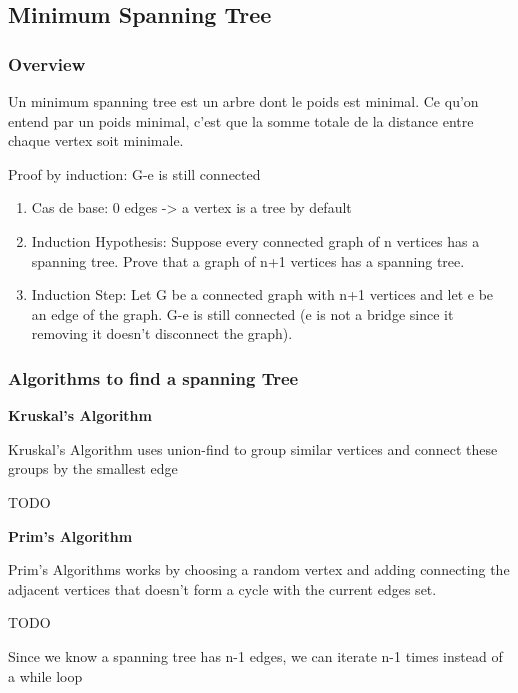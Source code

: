 \documentclass{article}
\begin{document}
\subsection{Minimum Spanning Tree}%
\label{sub:Minimum Spanning Tree}

\subsubsection{Overview}%
\label{ssub:Overview}

Un minimum spanning tree est un arbre dont le poids est minimal. Ce qu'on
entend par un poids minimal, c'est que la somme totale de la distance entre
chaque vertex soit minimale.

\begin{theorem}
    Proof by induction: G-e is still connected
    \begin{enumerate}
        \item Cas de base: 0 edges -> a vertex is a tree by default
	\item Induction Hypothesis: Suppose every connected graph of n vertices
	    has a spanning tree. Prove that a graph of n+1 vertices has a
	    spanning tree.
	\item Induction Step: Let G be a connected graph with n+1 vertices and
	    let e be an edge of the graph. G-e is still connected (e is not
	    a bridge since it removing it doesn't disconnect the graph).
    \end{enumerate}
\end{theorem}

\subsubsection{Algorithms to find a spanning Tree}%
\label{ssub:}

\textbf{Kruskal's Algorithm}

Kruskal's Algorithm uses union-find to group similar vertices and connect these
groups by the smallest edge

TODO

\textbf{Prim's Algorithm}

Prim's Algorithms works by choosing a random vertex and adding connecting the
adjacent vertices that doesn't form a cycle with the current edges set.

TODO

\begin{remark}
    Since we know a spanning tree has n-1 edges, we can iterate n-1 times
    instead of a while loop
\end{remark}
\end{document}
